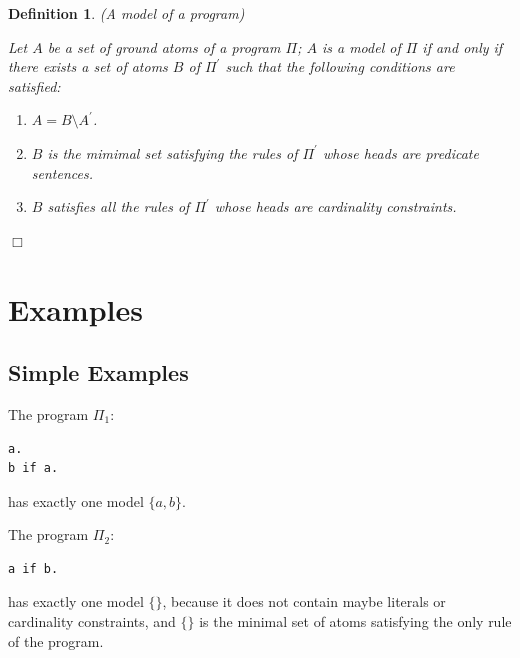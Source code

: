 \documentclass[a4paper,10pt]{article}
\newtheorem{definition}{Definition}
\providecommand{\DIFaddbegin}{} %
\providecommand{\DIFaddend}{} %
\providecommand{\DIFdelbegin}{} %
\providecommand{\DIFdelend}{} %
\begin{document}
\DIFaddend \begin{definition}(A model of a program)\\
\DIFdelbegin %
\DIFdelend \DIFaddbegin \rm{
Let $A$ be a set of ground atoms of a program $\Pi$; $A$ is a model of $\Pi$ if and only if 
there exists a set of atoms $B$ of $\Pi^\prime$ such that  the following conditions are satisfied:
\begin{enumerate}
\item $A = B \setminus A^\prime$.
\item $B$ is the mimimal set satisfying the rules of $\Pi^\prime$ whose heads are predicate sentences.
\item $B$ satisfies all the rules of $\Pi^\prime$ whose heads are cardinality constraints.
\end{enumerate}
}
\DIFaddend \hfill$\Box$
\end{definition}

\section{Examples}

\subsection{Simple Examples} 

The program $\Pi_1$:
\begin{verbatim}
a.
b if a.
\end{verbatim}
has exactly one model $\{a,b\}$.

\medskip\noindent
The program $\Pi_2$:
\begin{verbatim}
a if b.
\end{verbatim}
has exactly one model $\{\}$, because it  does not contain maybe literals or cardinality constraints, and $\{\}$ is the minimal set of atoms satisfying the only rule of the program.
\end{document}
